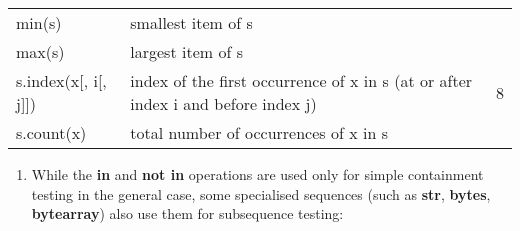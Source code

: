 \documentclass[11pt]{article}
\providecommand{\tightlist}{%
      \setlength{\itemsep}{0pt}\setlength{\parskip}{0pt}}
\begin{document}
\begin{longtable}[]{@{}lll@{}}
\begin{minipage}[t]{0.14\columnwidth}
min(s)\strut
\end{minipage} & \begin{minipage}[t]{0.14\columnwidth}\raggedright\strut
smallest item of s\strut
\end{minipage} & \begin{minipage}[t]{0.14\columnwidth}\raggedright\strut
\strut
\end{minipage}\tabularnewline
\begin{minipage}[t]{0.14\columnwidth}\raggedright\strut
max(s)\strut
\end{minipage} & \begin{minipage}[t]{0.14\columnwidth}\raggedright\strut
largest item of s\strut
\end{minipage} & \begin{minipage}[t]{0.14\columnwidth}\raggedright\strut
\strut
\end{minipage}\tabularnewline
\begin{minipage}[t]{0.14\columnwidth}\raggedright\strut
s.index(x{[}, i{[}, j{]}{]})\strut
\end{minipage} & \begin{minipage}[t]{0.14\columnwidth}\raggedright\strut
index of the first occurrence of x in s (at or after index i and before
index j)\strut
\end{minipage} & \begin{minipage}[t]{0.14\columnwidth}\raggedright\strut
8\strut
\end{minipage}\tabularnewline
\begin{minipage}[t]{0.14\columnwidth}\raggedright\strut
s.count(x)\strut
\end{minipage} & \begin{minipage}[t]{0.14\columnwidth}\raggedright\strut
total number of occurrences of x in s\strut
\end{minipage} & \begin{minipage}[t]{0.14\columnwidth}\raggedright\strut
\strut
\end{minipage}\tabularnewline
\bottomrule
\end{longtable}

\begin{enumerate}
\def\labelenumi{\arabic{enumi}.}
\tightlist
\item
  While the \textbf{in} and \textbf{not in} operations are used only for
  simple containment testing in the general case, some specialised
  sequences (such as \textbf{str}, \textbf{bytes}, \textbf{bytearray})
  also use them for subsequence testing:
\end{enumerate}
\end{document}
